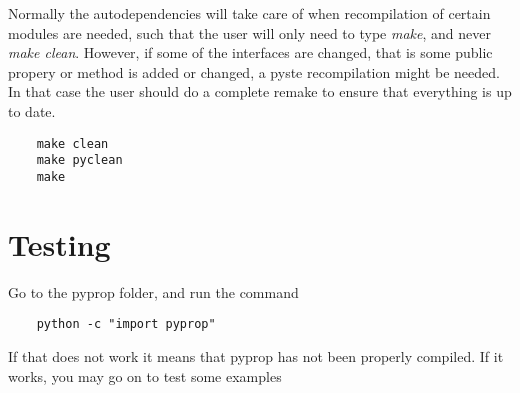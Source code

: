 Normally the autodependencies will take care of when recompilation of certain modules are needed, 
such that the user will only need to type \textit{make}, and never \textit{make clean}. However, if
some of the interfaces are changed, that is some public propery or method is added or changed, a pyste
recompilation might be needed. In that case the user should do a complete remake to ensure that everything
is up to date.
\begin{verbatim}
	make clean
	make pyclean
	make
\end{verbatim}

\section{Testing}
Go to the pyprop folder, and run the command
\begin{verbatim}
	python -c "import pyprop"
\end{verbatim}
If that does not work it means that pyprop has not been properly compiled. If it works, you may go 
on to test some examples

